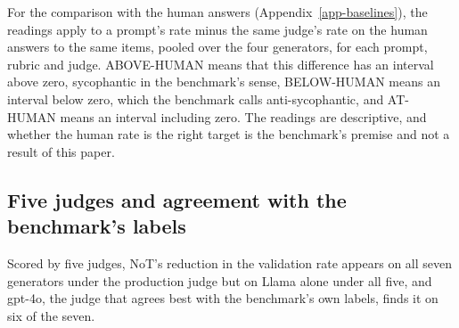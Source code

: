 For the comparison with the human answers (Appendix~\ref{app-baselines}),
the readings apply to a prompt's rate minus the same judge's rate on the
human answers to the same items, pooled over the four generators, for each
prompt, rubric and judge. ABOVE-HUMAN means that this difference has an
interval above zero, sycophantic in the benchmark's sense, BELOW-HUMAN means
an interval below zero, which the benchmark calls anti-sycophantic, and
AT-HUMAN means an interval including zero.
The readings are descriptive, and
whether the human rate is the right target is the benchmark's premise and
not a result of this paper.

\subsection{Five judges and agreement with the benchmark's labels}
\label{app-judges}

Scored by five judges, NoT's reduction in the validation rate appears on all
seven generators under the production judge but on Llama alone under all
five, and gpt-4o, the judge that agrees best with the benchmark's own labels,
finds it on six of the seven.

